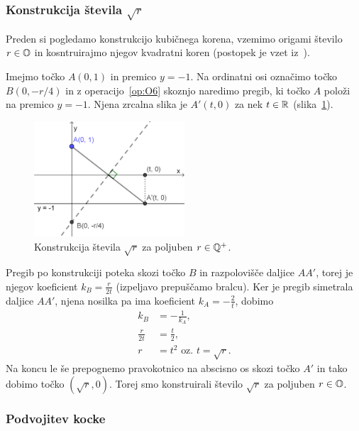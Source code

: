 \subsubsection*{Konstrukcija števila $\sqrt{r}$}

Preden si pogledamo konstrukcijo kubičnega korena, vzemimo origami število $r \in \mathbb O$ in kosntruirajmo njegov kvadratni koren (postopek je vzet iz~\cite[str.\ 58]{hull2013}).

Imejmo točko $A (0, 1) $ in premico $y = -1$. Na ordinatni osi označimo točko $B (0, -r/4)$ in z operacijo~\ref{op:O6} skoznjo naredimo pregib, ki točko $A$ položi na premico $y = -1$. Njena zrcalna slika je $A' (t, 0) $ za nek $t \in \mathbb R$ (slika~\ref{fig:konstrukcija_korena}).

\begin{figure}[h]
    \centering
    \includegraphics[width=0.5\textwidth]{images/kvadratni_koren.png}
    \caption[Konstrukcija korena]{Konstrukcija števila $\sqrt{r}$ za poljuben $r \in \mathbb Q^{+}$.}
    \label{fig:konstrukcija_korena}
\end{figure}

Pregib po konstrukciji poteka skozi točko $B$ in razpolovišče daljice $AA'$, torej je njegov koeficient $k_B = \frac{r}{2t}$ (izpeljavo prepuščamo bralcu). Ker je pregib simetrala daljice $AA'$, njena nosilka pa ima koeficient $k_A = - \frac{2}{t}$, dobimo
\begin{align*}
    k_B &= - \frac{1}{k_A},\\
    \frac{r}{2t} &= \frac{t}{2},\\
    r &= t^2 \text{ oz. } t = \sqrt{r}.
\end{align*}
Na koncu le še prepognemo pravokotnico na abscisno os skozi točko $A'$ in tako dobimo točko $(\sqrt{r}, 0)$. Torej smo konstruirali število $\sqrt{r}$ za poljuben $r \in \mathbb O$.

\subsubsection{Podvojitev kocke}
\label{podpogl:podvojitev_kocke}


